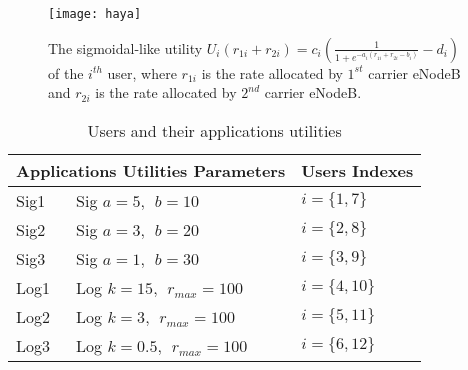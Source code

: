 \documentclass[journal]{IEEEtran} 		\usepackage{amsmath,amssymb}
\begin{document}
\begin{figure}[tb]
\centering
\texttt{[image: haya]}
\caption{The sigmoidal-like utility $U_i(r_{1i} + r_{2i}) = c_i(\frac{1}{1+e^{-a_i(r_{1i} + r_{2i}-b_i)}}-d_i)$ of the $i^{th}$ user, where $r_{1i}$ is the rate allocated by $1^{st}$ carrier eNodeB and $r_{2i}$ is the rate allocated by $2^{nd}$ carrier eNodeB.}
\label{fig:Utility3D}
\end{figure}
\begin {table}[]
\caption {Users and their applications utilities}
\label{table:parameters}
\begin{center}
\renewcommand{\arraystretch}{1.4} \begin{tabular}{| l | l | l | }
\hline
  \multicolumn{2}{|c|}{Applications Utilities Parameters} & \multicolumn{1}{|c|}{Users Indexes} \\  \hline
  Sig1 & Sig $a=5,\:\: b=10$  &  $i=\{1,7\}$ \\ \hline
  Sig2 & Sig $a=3,\:\: b=20$ & $i=\{2,8\}$  \\ \hline
  Sig3 & Sig $a=1,\:\: b=30$ & $i=\{3,9\}$   \\ \hline
  Log1 & Log $k=15,\:\: r_{max}=100$ & $i=\{4,10\}$   \\ \hline
  Log2 & Log $k=3,\:\: r_{max}=100$ & $i=\{5,11\}$   \\ \hline
  Log3 & Log $k=0.5,\:\: r_{max}=100$ & $i=\{6,12\}$ \\ \hline
\end{tabular}
\end{center}
\end {table}
\end{document}
